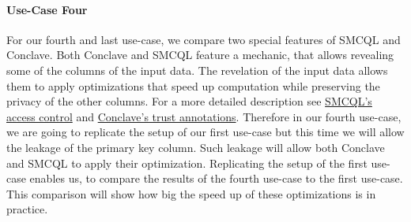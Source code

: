 \paragraph{Use-Case Four}
For our fourth and last use-case, we compare two special features of SMCQL and Conclave. Both Conclave and SMCQL feature a mechanic, that allows revealing some of the columns of the input data. The revelation of the input data allows them to apply optimizations that speed up computation while preserving the privacy of the other columns. For a more detailed description see \hyperref[Accesses_label]{SMCQL's access control} and \hyperref[Trust_label]{Conclave's trust annotations}. Therefore in our fourth use-case, we are going to replicate the setup of our first use-case but this time we will allow the leakage of the primary key column. Such leakage will allow both Conclave and SMCQL to apply their optimization. Replicating the setup of the first use-case enables us, to compare the results of the fourth use-case to the first use-case. This comparison will show how big the speed up of these optimizations is in practice. 
















